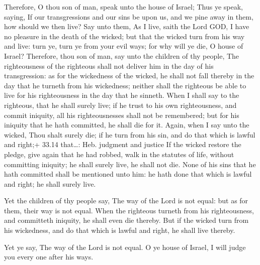  Therefore, O thou son of man, speak unto the house of
Israel; Thus ye speak, saying, If our transgressions and our sins be
upon us, and we pine away in them, how should we then live?
 Say unto them, As I live, saith the Lord GOD, I have no
pleasure in the death of the wicked; but that the wicked turn from his
way and live: turn ye, turn ye from your evil ways; for why will ye die,
O house of Israel?  Therefore, thou son of man, say unto
the children of thy people, The righteousness of the righteous shall not
deliver him in the day of his transgression: as for the wickedness of
the wicked, he shall not fall thereby in the day that he turneth from
his wickedness; neither shall the righteous be able to live for his
righteousness in the day that he sinneth.  When I shall say
to the righteous, that he shall surely live; if he trust to his own
righteousness, and commit iniquity, all his righteousnesses shall not be
remembered; but for his iniquity that he hath committed, he shall die
for it.  Again, when I say unto the wicked, Thou shalt
surely die; if he turn from his sin, and do that which is lawful and
right;+ 33.14 that\ldots: Heb. judgment and justice  If the
wicked restore the pledge, give again that he had robbed, walk in the
statutes of life, without committing iniquity; he shall surely live, he
shall not die.  None of his sins that he hath committed
shall be mentioned unto him: he hath done that which is lawful and
right; he shall surely live.

 Yet the children of thy people say, The way of the Lord
is not equal: but as for them, their way is not equal. 
When the righteous turneth from his righteousness, and committeth
iniquity, he shall even die thereby.  But if the wicked
turn from his wickedness, and do that which is lawful and right, he
shall live thereby.

 Yet ye say, The way of the Lord is not equal. O ye house
of Israel, I will judge you every one after his ways.

